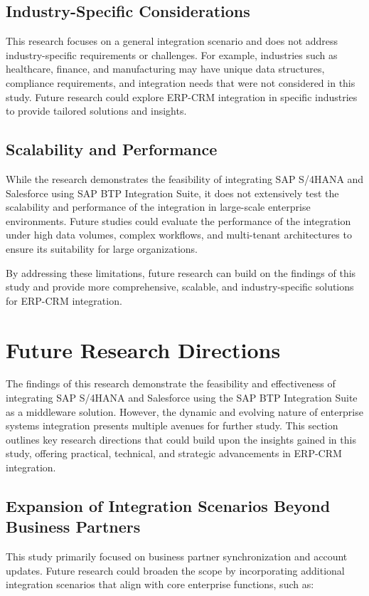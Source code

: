 \subsection{Industry-Specific Considerations}
This research focuses on a general integration scenario and does not address industry-specific requirements or challenges. For example, industries such as healthcare, finance, and manufacturing may have unique data structures, compliance requirements, and integration needs that were not considered in this study. Future research could explore ERP-CRM integration in specific industries to provide tailored solutions and insights.

\subsection{Scalability and Performance}
While the research demonstrates the feasibility of integrating SAP S/4HANA and Salesforce using SAP BTP Integration Suite, it does not extensively test the scalability and performance of the integration in large-scale enterprise environments. Future studies could evaluate the performance of the integration under high data volumes, complex workflows, and multi-tenant architectures to ensure its suitability for large organizations.

By addressing these limitations, future research can build on the findings of this study and provide more comprehensive, scalable, and industry-specific solutions for ERP-CRM integration.


\section{Future Research Directions}

The findings of this research demonstrate the feasibility and effectiveness of integrating SAP S/4HANA and Salesforce using the SAP BTP Integration Suite as a middleware solution. However, the dynamic and evolving nature of enterprise systems integration presents multiple avenues for further study. This section outlines key research directions that could build upon the insights gained in this study, offering practical, technical, and strategic advancements in ERP-CRM integration.

\subsection{Expansion of Integration Scenarios Beyond Business Partners}
This study primarily focused on business partner synchronization and account updates. Future research could broaden the scope by incorporating additional integration scenarios that align with core enterprise functions, such as:

